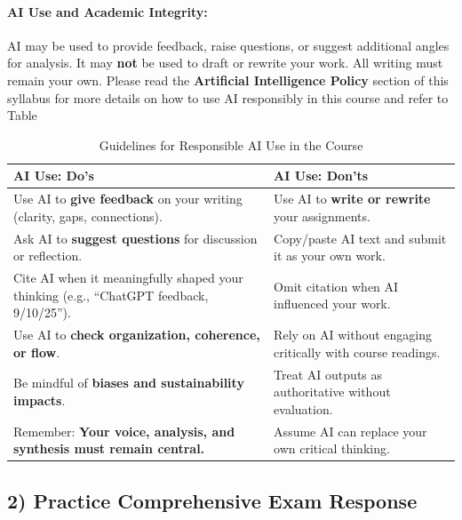 \documentclass[12pt, letterpaper]{article}
\begin{document}
\paragraph*{AI Use and Academic Integrity:} AI may be used to provide feedback, raise questions, or suggest additional angles for analysis. It may \textbf{not} be used to draft or rewrite your work. All writing must remain your own. Please read the \textbf{Artificial Intelligence Policy} section of this syllabus for more details on how to use AI responsibly in this course and refer to Table

\begin{center}
\begin{table}[h!]
\centering
\caption{Guidelines for Responsible AI Use in the Course}
\label{tab:ai-guidelines}
\begin{tabular}{|p{6cm}|p{6cm}|}
\hline
\rowcolor{gray!20} 
\textbf{AI Use: Do's} & \textbf{AI Use: Don'ts} \\
\hline
Use AI to \textbf{give feedback} on your writing (clarity, gaps, connections). & Use AI to \textbf{write or rewrite} your assignments. \\
\hline
Ask AI to \textbf{suggest questions} for discussion or reflection. & Copy/paste AI text and submit it as your own work. \\
\hline
Cite AI when it meaningfully shaped your thinking (e.g., ``ChatGPT feedback, 9/10/25''). & Omit citation when AI influenced your work. \\
\hline
Use AI to \textbf{check organization, coherence, or flow}. & Rely on AI without engaging critically with course readings. \\
\hline
Be mindful of \textbf{biases and sustainability impacts}. & Treat AI outputs as authoritative without evaluation. \\
\hline
Remember: \textbf{Your voice, analysis, and synthesis must remain central.} & Assume AI can replace your own critical thinking. \\
\hline
\end{tabular}
\end{table}
\end{center}


\subsection*{2) Practice Comprehensive Exam Response}
\end{document}
